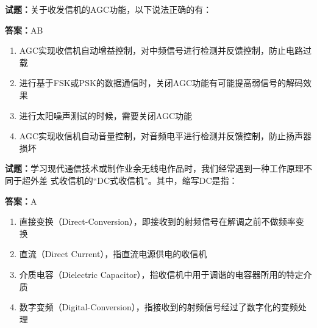\documentclass{ctexbook}
\begin{document}




\vspace{1em}

\textbf{试题：}关于收发信机的AGC功能，以下说法正确的有： 

\textbf{答案：}AB 

\begin{enumerate}[leftmargin=3em]
  \item AGC实现收信机自动增益控制，对中频信号进行检测并反馈控制，防止电路过载 

  \item 进行基于FSK或PSK的数据通信时，关闭AGC功能有可能提高弱信号的解码效果 

  \item 进行太阳噪声测试的时候，需要关闭AGC功能 

  \item AGC实现收信机自动音量控制，对音频电平进行检测并反馈控制，防止扬声器损坏 

\end{enumerate}





\vspace{1em}

\textbf{试题：}学习现代通信技术或制作业余无线电作品时，我们经常遇到一种工作原理不同于超外差
式收信机的“DC式收信机”。其中，缩写DC是指： 


\textbf{答案：}A 

\begin{enumerate}[leftmargin=3em]
  \item 直接变换（Direct-Conversion），即接收到的射频信号在解调之前不做频率变换 

  \item 直流（Direct Current），指直流电源供电的收信机 

  \item 介质电容（Dielectric Capacitor），指收信机中用于调谐的电容器所用的特定介质 

  \item 数字变频（Digital-Conversion），指接收到的射频信号经过了数字化的变频处理 

\end{enumerate}



\end{document}
